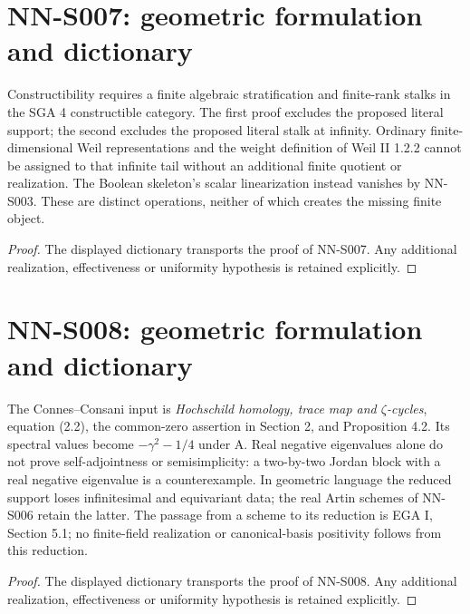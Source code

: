 \section{NN-S007: geometric formulation and dictionary}
\begin{geometricstatement}[NN-S007]
Constructibility requires a finite algebraic stratification and
finite-rank stalks in the SGA 4 constructible category. The first
proof excludes the proposed literal support; the second excludes
the proposed literal stalk at infinity. Ordinary finite-dimensional
Weil representations and the weight definition of Weil II 1.2.2
cannot be assigned to that infinite tail without an additional
finite quotient or realization. The Boolean skeleton's scalar
linearization instead vanishes by NN-S003. These are distinct
operations, neither of which creates the missing finite object.
\end{geometricstatement}
\begin{proof} The displayed dictionary transports the proof of NN-S007. Any additional realization, effectiveness or uniformity hypothesis is retained explicitly.\end{proof}


\section{NN-S008: geometric formulation and dictionary}
\begin{geometricstatement}[NN-S008]
The Connes--Consani input is \emph{Hochschild homology, trace map
and $\zeta$-cycles}, equation (2.2), the common-zero assertion in
Section 2, and Proposition 4.2. Its spectral values become
$-\gamma^2-1/4$ under A. Real negative eigenvalues alone do not
prove self-adjointness or semisimplicity: a two-by-two Jordan
block with a real negative eigenvalue is a counterexample.
In geometric language the reduced support loses infinitesimal
and equivariant data; the real Artin schemes of NN-S006 retain
the latter. The passage from a scheme to its reduction is EGA I,
Section 5.1; no finite-field realization or canonical-basis
positivity follows from this reduction.
\end{geometricstatement}
\begin{proof} The displayed dictionary transports the proof of NN-S008. Any additional realization, effectiveness or uniformity hypothesis is retained explicitly.\end{proof}


